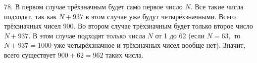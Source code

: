 78. В первом случае трёхзначным будет само первое число $N.$ Все такие числа подходят, так как $N+937$ в этом случае уже будут четырёхзначными. Всего трёхзначных чисел 900. Во втором случае трёхзначным будет только второе число $N+937.$ В этом случае подходят только числа $N$ от 1 до 62 (если $N=63,$ то $N+937=1000$ уже четырёхзначное и трёхзначных чисел вообще нет). Значит, всего существует $900+62=962$ таких числа.\\
